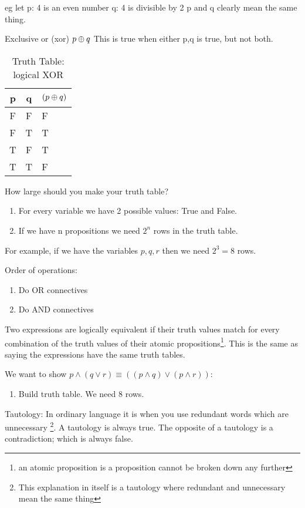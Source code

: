 eg let p: 4 is an even number
       q: 4 is divisible by 2
       p and q clearly mean the same thing.
       
Exclusive or (xor) $p \oplus q$
This is true when either p,q is true, but not both.

\begin{table}[!htb]
\label{tab:TruthTableXOR}
\begin{tabularx}{\linewidth}{| c | c | X |} \hline
  p & q & $( p \oplus q )$ \\ \hline \hline
  F & F & F \\ \hline
  F & T & T \\ \hline
  T & F & T \\ \hline
  T & T & F \\ \hline
\end{tabularx}
\caption{Truth Table: logical XOR}
\end{table}

How large should you make your truth table?
\begin{enumerate}
  \item For every variable we have 2 possible values: True and False.
  \item If we have n propositions we need ${2}^{n}$ rows in the truth table.
\end{enumerate}
For example, if we have the variables $p,q,r$ then we need ${2}^{3} = 8$ rows.


Order of operations:

\begin{enumerate}
  \item Do OR connectives
  \item Do AND connectives
\end{enumerate}


Two expressions are logically equivalent if their truth values match for every
combination of the truth values of their atomic propositions\footnote{an atomic
proposition is a proposition cannot be broken down any further}. This is the
same as saying the expressions have the same truth tables.

We want to show $p \land (q \lor r) \equiv ( (p \land q) \lor (p \land r) )$:
\begin{enumerate}
  \item Build truth table. We need 8 rows.
\end{enumerate}

Tautology: In ordinary language it is when you use redundant words which are
unnecessary \footnote{This explanation in itself is a tautology where redundant
and unnecessary mean the same thing}. A tautology is always true. The opposite
of a tautology is a contradiction; which is always false.


